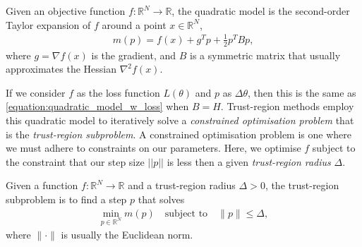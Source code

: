 \begin{definition}
    Given an objective function $f: \mathbb{R}^N \to \mathbb{R}$, the quadratic model is the second-order Taylor expansion of $f$ around a point $x \in \mathbb{R}^N$,
    \begin{align}
    m(p) = f(x) + g^T p + \frac{1}{2} p^T B p,
    \label{eq:tr_quadratic_model}
    \end{align}
    where $g = \nabla f(x)$ is the gradient, and $B$ is a symmetric matrix that usually approximates the Hessian $\nabla^2 f(x)$.
\end{definition}
If we consider $f$ as the loss function $L(\theta)$ and $p$ as $\Delta \theta$, then this is the same as \cref{equation:quadratic_model_w_loss} when $B = H$. Trust-region methods employ this quadratic model to iteratively solve a \textit{constrained optimisation problem} that is the \textit{trust-region subproblem}. A constrained optimisation problem is one where we must adhere to constraints on our parameters. Here, we optimise $f$ subject to the constraint that our step size $||p||$ is less then a given \textit{trust-region radius} $\Delta$.

\begin{definition}
    Given a function $f: \mathbb{R}^N \to \mathbb{R}$ and a trust-region radius $\Delta > 0$, the trust-region subproblem is to find a step $p$ that solves
    \begin{align}
        \min_{p \in \mathbb{R}^N} m(p) \quad \text{subject to} \quad \|p\| \leq \Delta,
        \label{eq:tr_subproblem}
    \end{align}
    where $\| \cdot \|$ is usually the Euclidean norm.
\end{definition}

